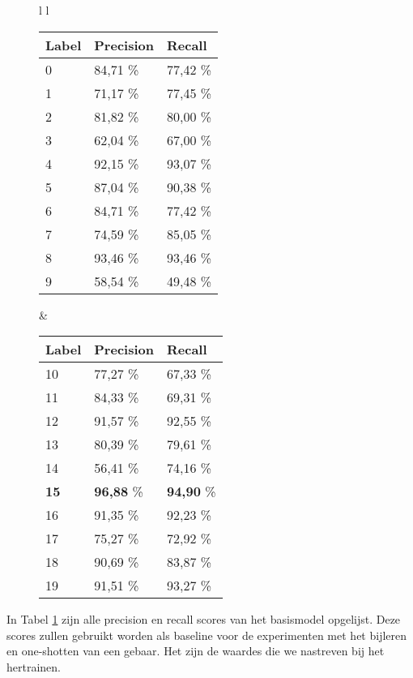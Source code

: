 \begin{figure}
	\vspace{1cm}
	\begin{tabular}{l l}
		\begin{tabular}{l l l}
			\hline
			\textbf{Label} & \textbf{Precision} &
			\textbf{Recall}\\
			\hline
			0 & 84,71 \% & 77,42 \% \\
			1 & 71,17 \% & 77,45 \% \\
			2 & 81,82 \% & 80,00 \% \\
			3 & 62,04 \% & 67,00 \% \\
			4 & 92,15 \% & 93,07 \% \\
			5 & 87,04 \% & 90,38 \% \\
			6 & 84,71 \% & 77,42 \% \\
			7 & 74,59 \% & 85,05 \% \\
			8 & 93,46 \% & 93,46 \% \\
			9 & 58,54 \% & 49,48 \% \\
			\hline
		\end{tabular} & 
		\begin{tabular}{l l l}
			\hline
			\textbf{Label} & \textbf{Precision} &
			\textbf{Recall}\\
			\hline
			10 & 77,27 \% & 67,33 \% \\
			11 & 84,33 \% & 69,31 \% \\
			12 & 91,57 \% & 92,55 \% \\
			13 & 80,39 \% & 79,61 \% \\
			14 & 56,41 \% & 74,16 \% \\
			\textbf{15} & \textbf{96,88} \% & \textbf{94,90} \% \\
			16 & 91,35 \% & 92,23 \% \\
			17 & 75,27 \% & 72,92 \% \\
			18 & 90,69 \% & 83,87 \% \\
			19 & 91,51 \% & 93,27 \% \\
			\hline
		\end{tabular}	
	\end{tabular}
	\label{tab:pr-alle-klassen}
\end{figure}

\npar In Tabel \ref{tab:pr-alle-klassen} zijn alle precision en recall scores van het basismodel opgelijst. Deze scores zullen gebruikt worden als baseline voor de experimenten met het bijleren en one-shotten van een gebaar. Het zijn de waardes die we nastreven bij het hertrainen.



